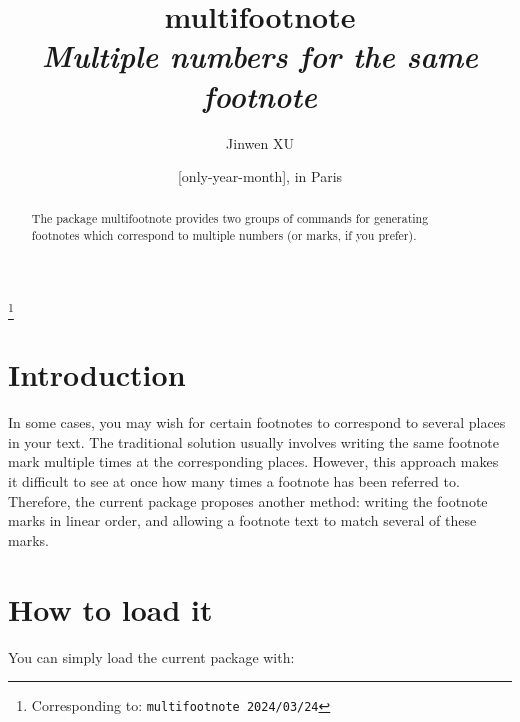 \documentclass[classical]{einfart}
\newcommand{\meta}[1]{$\langle${\normalfont\itshape#1}$\rangle$}
\newcommand{\multifootnotepackage}{{\normalfont\textsf{multifootnote}}}
\begin{document}
\def\PackageVersion{2024/03/24}

\title{\multifootnotepackage{}\\\smallskip\itshape Multiple numbers for the same footnote}
\author{Jinwen XU}
\thanks{Corresponding to: \texttt{\multifootnotepackage{} \PackageVersion}}
\date{\TheDate{\PackageVersion}[only-year-month], in Paris}

\maketitle

\begin{abstract}
    \raggedleft
    The package \multifootnotepackage{} provides two groups of commands for generating\\footnotes which correspond to multiple numbers (or marks, if you prefer).
\end{abstract}


\addtocounter{section}{-1}
\section{Introduction}

In some cases, you may wish for certain footnotes to correspond to several places in your text. The traditional solution usually involves writing the same footnote mark multiple times at the corresponding places. However, this approach makes it difficult to see at once how many times a footnote has been referred to. Therefore, the current package proposes another method: writing the footnote marks in linear order, and allowing a footnote text to match several of these marks.


\section{How to load it}

You can simply load the current package with:

\begin{code}
\usepackage[(*\meta{options}*)]{multifootnote}
\end{code}
\end{document}
